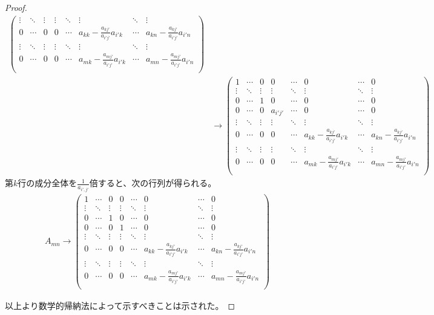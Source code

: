 \documentclass[dvipdfmx]{jsarticle}
\begin{document}
\begin{proof}
\begin{align*}
\begin{pmatrix}
 \vdots & \ddots & \vdots & \vdots & \ddots & \vdots & \ddots & \vdots \\
0 & \cdots & 0 & 0 & \cdots & a_{kk} - \frac{a_{kj'}}{a_{i'j'}}a_{i'k} & \cdots & a_{kn} - \frac{a_{kj'}}{a_{i'j'}}a_{i'n} \\
 \vdots & \ddots & \vdots & \vdots & \ddots & \vdots & \ddots & \vdots \\
0 & \cdots & 0 & 0 & \cdots & a_{mk} - \frac{a_{mj'}}{a_{i'j'}}a_{i'k} & \cdots & a_{mn} - \frac{a_{mj'}}{a_{i'j'}}a_{i'n} \\
\end{pmatrix}\\
&\rightarrow \begin{pmatrix}
1 & \cdots & 0 & 0 & \cdots & 0 & \cdots & 0 \\
 \vdots & \ddots & \vdots & \vdots & \ddots & \vdots & \ddots & \vdots \\
0 & \cdots & 1 & 0 & \cdots & 0 & \cdots & 0 \\
0 & \cdots & 0 & a_{i'j'} & \cdots & 0 & \cdots & 0 \\
 \vdots & \ddots & \vdots & \vdots & \ddots & \vdots & \ddots & \vdots \\
0 & \cdots & 0 & 0 & \cdots & a_{kk} - \frac{a_{kj'}}{a_{i'j'}}a_{i'k} & \cdots & a_{kn} - \frac{a_{kj'}}{a_{i'j'}}a_{i'n} \\
 \vdots & \ddots & \vdots & \vdots & \ddots & \vdots & \ddots & \vdots \\
0 & \cdots & 0 & 0 & \cdots & a_{mk} - \frac{a_{mj'}}{a_{i'j'}}a_{i'k} & \cdots & a_{mn} - \frac{a_{mj'}}{a_{i'j'}}a_{i'n} \\
\end{pmatrix}
\end{align*}
第$k$行の成分全体を$\frac{1}{a_{i',j'}}$倍すると、次の行列が得られる。
\begin{align*}
A_{mn} \rightarrow \begin{pmatrix}
1 & \cdots & 0 & 0 & \cdots & 0 & \cdots & 0 \\
 \vdots & \ddots & \vdots & \vdots & \ddots & \vdots & \ddots & \vdots \\
0 & \cdots & 1 & 0 & \cdots & 0 & \cdots & 0 \\
0 & \cdots & 0 & 1 & \cdots & 0 & \cdots & 0 \\
 \vdots & \ddots & \vdots & \vdots & \ddots & \vdots & \ddots & \vdots \\
0 & \cdots & 0 & 0 & \cdots & a_{kk} - \frac{a_{kj'}}{a_{i'j'}}a_{i'k} & \cdots & a_{kn} - \frac{a_{kj'}}{a_{i'j'}}a_{i'n} \\
 \vdots & \ddots & \vdots & \vdots & \ddots & \vdots & \ddots & \vdots \\
0 & \cdots & 0 & 0 & \cdots & a_{mk} - \frac{a_{mj'}}{a_{i'j'}}a_{i'k} & \cdots & a_{mn} - \frac{a_{mj'}}{a_{i'j'}}a_{i'n} \\
\end{pmatrix}
\end{align*}\par
以上より数学的帰納法によって示すべきことは示された。
\end{proof}
\end{document}
